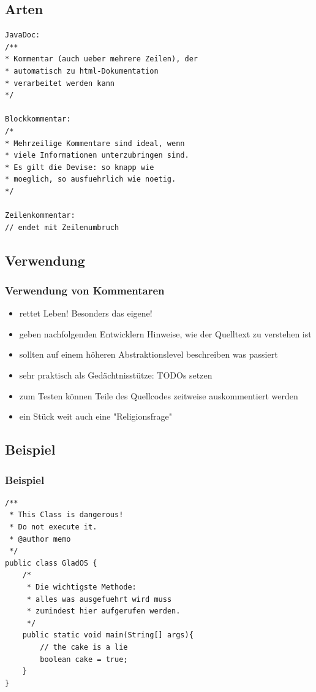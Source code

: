 \documentclass[final]{beamer}
\begin{document}
\subsection{Arten}
\begin{frame}[containsverbatim]
	\begin{lstlisting}
JavaDoc:
/**
* Kommentar (auch ueber mehrere Zeilen), der
* automatisch zu html-Dokumentation
* verarbeitet werden kann
*/

Blockkommentar:
/*
* Mehrzeilige Kommentare sind ideal, wenn
* viele Informationen unterzubringen sind.
* Es gilt die Devise: so knapp wie
* moeglich, so ausfuehrlich wie noetig.
*/

Zeilenkommentar:
// endet mit Zeilenumbruch
	\end{lstlisting}
\end{frame}

\subsection{Verwendung}
\begin{frame}
	\frametitle{Verwendung von Kommentaren}
	\begin{itemize}
		\item{rettet Leben! Besonders das eigene!}
		\item{geben nachfolgenden Entwicklern Hinweise, wie der Quelltext zu verstehen ist}
		\item{sollten auf einem höheren Abstraktionslevel beschreiben was passiert}
		\item{sehr praktisch als Gedächtnisstütze: TODOs setzen}
		\item{zum Testen können Teile des Quellcodes zeitweise auskommentiert werden}
		\pause
		\item{ein Stück weit auch eine "Religionsfrage"}
	\end{itemize}
\end{frame}

\subsection{Beispiel}
\begin{frame}[containsverbatim]
\frametitle{Beispiel}
	\begin{lstlisting}
/**
 * This Class is dangerous!
 * Do not execute it.
 * @author memo
 */
public class GladOS {
	/*
	 * Die wichtigste Methode:
	 * alles was ausgefuehrt wird muss
	 * zumindest hier aufgerufen werden.
	 */
	public static void main(String[] args){
		// the cake is a lie
		boolean cake = true;
	}
}
	\end{lstlisting}
%
\end{frame}
\end{document}
